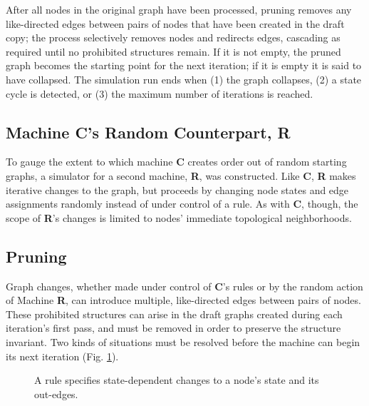 \documentclass[twoside,twocolumn]{article}
\begin{document}
After all nodes in the original graph have been processed, pruning removes
any like-directed edges between pairs of nodes that have been created in the
draft copy; the process selectively removes nodes
and redirects edges, cascading as required until no prohibited structures remain.
If it is not empty, the pruned graph becomes the starting point for the next iteration;
if it is empty it is said to have collapsed.
The simulation run ends when (1) the graph collapses, (2) a state cycle is detected,
or (3) the maximum number of iterations is reached.

\subsection{Machine \textbf{C}'s Random Counterpart, \textbf{R}}

To gauge the extent to which machine \textbf{C} creates order out of
random starting graphs, a simulator for a second machine, \textbf{R},
was constructed. Like \textbf{C}, \textbf{R} makes iterative changes to the
graph, but proceeds by changing node states and edge assignments randomly
instead of under control of a rule. As with \textbf{C}, though, the scope
of \textbf{R}'s changes is limited to nodes' immediate topological neighborhoods.

\subsection{Pruning}

Graph changes, whether made under control of \textbf{C}'s rules or by the
random action of Machine \textbf{R}, can introduce multiple, like-directed
edges between pairs of nodes. These prohibited structures can arise in the draft graphs created
during each iteration's first pass, and must be removed in order to preserve
the structure invariant. Two kinds of situations must be resolved before
the machine can begin its next iteration (Fig. \ref{fig:Fig2}).

\begin{figure}[tb] 
    \centering
    \caption{A rule specifies state-dependent changes to a node's state and its out-edges.}
    \label{fig:Fig2}
\end{figure}
\end{document}
